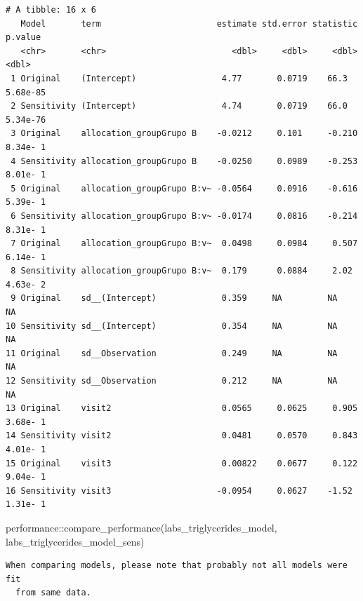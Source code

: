 \documentclass[
  letterpaper,
  DIV=11,
  numbers=noendperiod]{scrartcl}
\newenvironment{Shaded}{\begin{snugshade}}{\end{snugshade}}
\newcommand{\FunctionTok}[1]{\textcolor[rgb]{0.28,0.35,0.67}{#1}}
\newcommand{\NormalTok}[1]{\textcolor[rgb]{0.00,0.23,0.31}{#1}}
\newcommand{\SpecialCharTok}[1]{\textcolor[rgb]{0.37,0.37,0.37}{#1}}
\begin{document}
\begin{verbatim}
# A tibble: 16 x 6
   Model       term                       estimate std.error statistic   p.value
   <chr>       <chr>                         <dbl>     <dbl>     <dbl>     <dbl>
 1 Original    (Intercept)                 4.77       0.0719    66.3    5.68e-85
 2 Sensitivity (Intercept)                 4.74       0.0719    66.0    5.34e-76
 3 Original    allocation_groupGrupo B    -0.0212     0.101     -0.210  8.34e- 1
 4 Sensitivity allocation_groupGrupo B    -0.0250     0.0989    -0.253  8.01e- 1
 5 Original    allocation_groupGrupo B:v~ -0.0564     0.0916    -0.616  5.39e- 1
 6 Sensitivity allocation_groupGrupo B:v~ -0.0174     0.0816    -0.214  8.31e- 1
 7 Original    allocation_groupGrupo B:v~  0.0498     0.0984     0.507  6.14e- 1
 8 Sensitivity allocation_groupGrupo B:v~  0.179      0.0884     2.02   4.63e- 2
 9 Original    sd__(Intercept)             0.359     NA         NA     NA       
10 Sensitivity sd__(Intercept)             0.354     NA         NA     NA       
11 Original    sd__Observation             0.249     NA         NA     NA       
12 Sensitivity sd__Observation             0.212     NA         NA     NA       
13 Original    visit2                      0.0565     0.0625     0.905  3.68e- 1
14 Sensitivity visit2                      0.0481     0.0570     0.843  4.01e- 1
15 Original    visit3                      0.00822    0.0677     0.122  9.04e- 1
16 Sensitivity visit3                     -0.0954     0.0627    -1.52   1.31e- 1
\end{verbatim}

\begin{Shaded}
\begin{Highlighting}[]
\NormalTok{performance}\SpecialCharTok{::}\FunctionTok{compare\_performance}\NormalTok{(labs\_triglycerides\_model, labs\_triglycerides\_model\_sens)}
\end{Highlighting}
\end{Shaded}

\begin{verbatim}
When comparing models, please note that probably not all models were fit
  from same data.
\end{verbatim}
\end{document}
